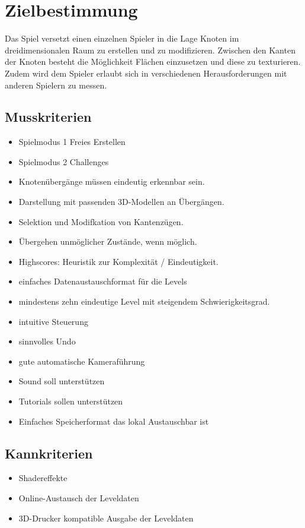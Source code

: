 \chapter{Zielbestimmung}

Das Spiel versetzt einen einzelnen Spieler in die Lage Knoten im dreidimensionalen Raum zu erstellen und zu modifizieren. Zwischen den Kanten der Knoten besteht die Möglichkeit Flächen einzusetzen und diese zu texturieren. Zudem wird dem Spieler erlaubt sich in verschiedenen Herausforderungen mit anderen Spielern zu messen.\\


\section{Musskriterien}

\begin{itemize}

	\item Spielmodus 1 Freies Erstellen
	
	\item Spielmodus 2 Challenges
	
	\item Knotenübergänge müssen eindeutig erkennbar sein.
	
	\item Darstellung mit passenden 3D-Modellen an Übergängen.
	
	\item Selektion und Modifkation von Kantenzügen.
	
	\item Übergehen unmöglicher Zustände, wenn möglich.
	
	\item Highscores: Heuristik zur Komplexität / Eindeutigkeit.
	
	\item einfaches Datenaustauschformat für die Levels
	
	\item mindestens zehn eindeutige Level mit steigendem Schwierigkeitsgrad.
	
	\item intuitive Steuerung
	
	\item sinnvolles Undo
	
	\item gute automatische Kameraführung
	
	\item Sound soll unterstützen
	
	\item Tutorials sollen unterstützen
	
	\item  Einfaches Speicherformat das lokal Austauschbar ist
	
\end{itemize}

\section{Kannkriterien}


\begin{itemize}
\item  Shadereffekte

\item Online-Austausch der Leveldaten

\item  3D-Drucker kompatible Ausgabe der Leveldaten
\end{itemize}

